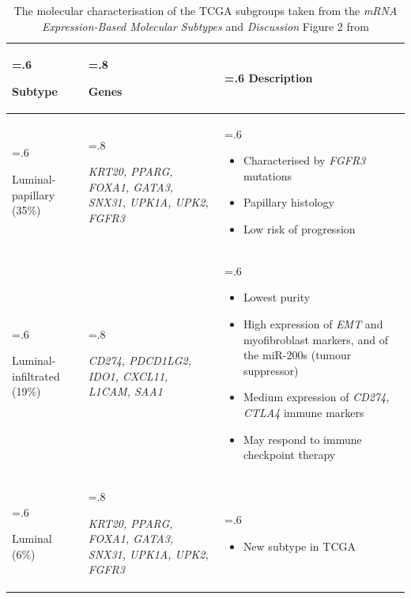 \begin{appendices}
\begin{table}[H]
\centering
\caption{The molecular characterisation of the TCGA subgroups taken from the \textit{mRNA Expression-Based Molecular Subtypes} and \textit{Discussion} Figure 2 from \cite{Robertson2017-mg}}
    \begin{tabularx}{\textwidth}{
      >{\hsize=.6\hsize\raggedright\arraybackslash}X
      >{\hsize=.8\hsize\raggedright\arraybackslash}X
      >{\hsize=.6\hsize\arraybackslash}X
    }
    \toprule
    Subtype & Genes & Description \\
    \midrule
    Luminal-papillary (35\%) & \textit{KRT20, PPARG, FOXA1, GATA3, SNX31, UPK1A, UPK2, FGFR3} & 
    \begin{itemize}[leftmargin=*, nosep, after=\vspace{-\baselineskip}, before=\vspace{-.6\baselineskip}]
        \item Characterised by \textit{FGFR3} mutations
        \item Papillary histology
        \item Low risk of progression
    \end{itemize} \\
    \midrule
    Luminal-infiltrated (19\%) & \textit{CD274, PDCD1LG2, IDO1, CXCL11, L1CAM, SAA1} & 
    \begin{itemize}[leftmargin=*, nosep, after=\vspace{-\baselineskip}, before=\vspace{-.6\baselineskip}]
        \item Lowest purity
        \item High expression of \textit{EMT} and myofibroblast markers, and of the miR-200s (tumour suppressor)
        \item Medium expression of \textit{CD274, CTLA4} immune markers
        \item May respond to immune checkpoint therapy
    \end{itemize} \\
    \midrule
    Luminal (6\%) & \textit{KRT20, PPARG, FOXA1, GATA3, SNX31, UPK1A, UPK2, FGFR3} & 
    \begin{itemize}[leftmargin=*, nosep, after=\vspace{-\baselineskip}, before=\vspace{-.6\baselineskip}]
        \item New subtype in TCGA
    \end{itemize} \\

\end{tabularx}
\end{table}
\end{appendices}
